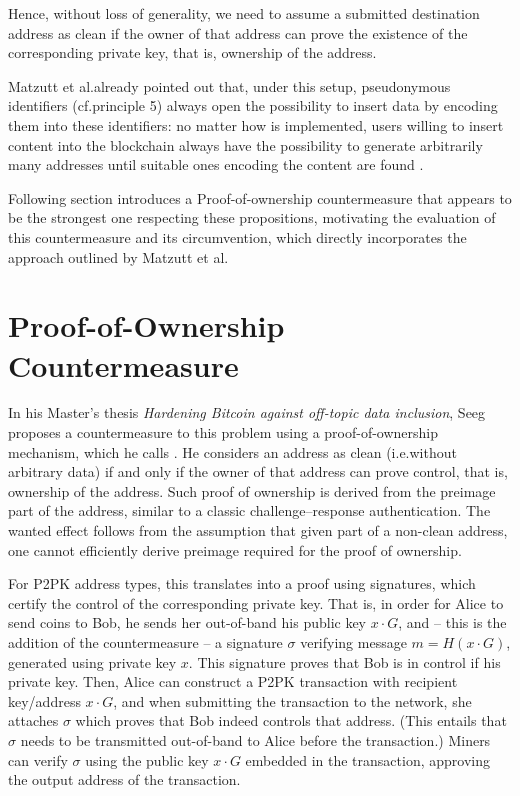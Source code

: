 \documentclass[a4paper,11pt,titlepage]{scrbook}
\begin{document}
Hence, without loss of generality, we need to assume a submitted destination address as clean if the owner of that address can prove the existence of the corresponding private key, that is, ownership of the address.

Matzutt et al.\@ already pointed out that, under this setup, pseudonymous identifiers (cf.\@ principle 5) always open the possibility to insert data by encoding them into these identifiers: no matter how  is implemented, users willing to insert content into the blockchain always have the possibility to generate arbitrarily many addresses until suitable ones encoding the content are found \cite[Sec.~III.C]{matzutt_thwarting_2018}.

Following section introduces a Proof-of-ownership countermeasure that appears to be the strongest one respecting these propositions, motivating the evaluation of this countermeasure and its circumvention, which directly incorporates the approach outlined by Matzutt et al.


\section{Proof-of-Ownership Countermeasure}

In his Master's thesis \emph{Hardening Bitcoin against off-topic data inclusion}, Seeg proposes a countermeasure to this problem using a proof-of-ownership mechanism, which he calls  \cite{seeg_hardening_2018}.
He considers an address as clean (i.e.\@ without arbitrary data) if and only if the owner of that address can prove control, that is, ownership of the address.
Such proof of ownership is derived from the  preimage part of the address, similar to a classic challenge–response authentication.
The wanted effect follows from the assumption that given  part of a non-clean address, one cannot efficiently derive  preimage required for the proof of ownership.

For P2PK address types, this translates into a proof using signatures, which certify the control of the corresponding private key.
That is, in order for Alice to send coins to Bob, he sends her out-of-band his public key $x\cdot G$, and – this is the addition of the countermeasure – a signature $\sigma$ verifying message $m=H(x\cdot G)$, generated using private key $x$.
This signature proves that Bob is in control if his private key.
Then, Alice can construct a P2PK transaction with recipient key/address $x\cdot G$, and when submitting the transaction to the network, she attaches $\sigma$ which proves that Bob indeed controls that address. 
(This entails that $\sigma$ needs to be transmitted out-of-band to Alice before the transaction.)
Miners can verify $\sigma$ using the public key $x\cdot G$ embedded in the transaction, approving the output address of the transaction.
\end{document}
